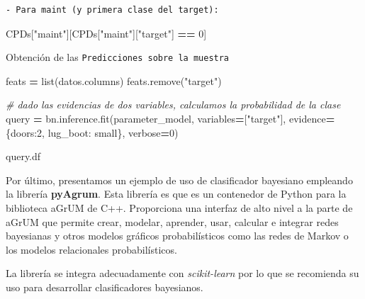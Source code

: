 \documentclass[
  a4paper,
  DIV=11,
  numbers=noendperiod]{scrreprt}
\newenvironment{Shaded}{\begin{snugshade}}{\end{snugshade}}
\newcommand{\BuiltInTok}[1]{#1}
\newcommand{\CommentTok}[1]{\textcolor[rgb]{0.56,0.35,0.01}{\textit{#1}}}
\newcommand{\DecValTok}[1]{\textcolor[rgb]{0.00,0.00,0.81}{#1}}
\newcommand{\NormalTok}[1]{#1}
\newcommand{\OperatorTok}[1]{\textcolor[rgb]{0.81,0.36,0.00}{\textbf{#1}}}
\newcommand{\StringTok}[1]{\textcolor[rgb]{0.31,0.60,0.02}{#1}}
\begin{document}
\begin{verbatim}
- Para maint (y primera clase del target):
\end{verbatim}

\begin{Shaded}
\begin{Highlighting}[numbers=left,,]
\NormalTok{CPDs[}\StringTok{"maint"}\NormalTok{][CPDs[}\StringTok{"maint"}\NormalTok{][}\StringTok{"target"}\NormalTok{] }\OperatorTok{==} \DecValTok{0}\NormalTok{]}
\end{Highlighting}
\end{Shaded}

Obtención de las \texttt{Predicciones\ sobre\ la\ muestra}

\begin{Shaded}
\begin{Highlighting}[numbers=left,,]
\NormalTok{feats }\OperatorTok{=} \BuiltInTok{list}\NormalTok{(datos.columns)}
\NormalTok{feats.remove(}\StringTok{"target"}\NormalTok{)}

\CommentTok{\# dado las evidencias de dos variables, calculamos la probabilidad de la clase}
\NormalTok{query }\OperatorTok{=}\NormalTok{ bn.inference.fit(parameter\_model, variables}\OperatorTok{=}\NormalTok{[}\StringTok{"target"}\NormalTok{], evidence}\OperatorTok{=}\NormalTok{\{}\StringTok{\textquotesingle{}doors\textquotesingle{}}\NormalTok{:}\DecValTok{2}\NormalTok{, }\StringTok{\textquotesingle{}lug\_boot\textquotesingle{}}\NormalTok{: }\StringTok{\textquotesingle{}small\textquotesingle{}}\NormalTok{\}, verbose}\OperatorTok{=}\DecValTok{0}\NormalTok{)}

\NormalTok{query.df}
\end{Highlighting}
\end{Shaded}

Por último, presentamos un ejemplo de uso de clasificador bayesiano
empleando la librería \textbf{pyAgrum}. Esta librería es que es un
contenedor de Python para la biblioteca aGrUM de C++. Proporciona una
interfaz de alto nivel a la parte de aGrUM que permite crear, modelar,
aprender, usar, calcular e integrar redes bayesianas y otros modelos
gráficos probabilísticos como las redes de Markov o los modelos
relacionales probabilísticos.

La librería se integra adecuadamente con \emph{scikit-learn} por lo que
se recomienda su uso para desarrollar clasificadores bayesianos.
\end{document}

